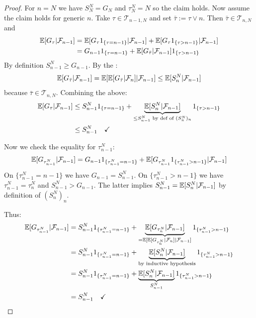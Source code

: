 \begin{proof}
     For $n=N$ we have $S_N^N = G_N$ and $\tau_N^N = N$ so the claim holds. Now assume the claim holds for generic $n$. Take $\tau \in \mathcal{T}_{n-1, N}$ and set $\bar{\tau} := \tau \vee n$. Then $\bar{\tau} \in \mathcal{T}_{n,N}$ and
    \begin{align*}
        \mathbb E[G_\tau | \mathcal{F}_{n-1}] &= \mathbb E[G_\tau 1_{\{\tau = n-1\}} | \mathcal{F}_{n-1}] + \mathbb E[G_\tau 1_{\{\tau > n-1\}} | \mathcal{F}_{n-1}] \\
        &= G_{n-1} 1_{\{\tau = n-1\}} + \mathbb E[G_{\bar{\tau}} | \mathcal{F}_{n-1}] 1_{\{\tau > n-1\}}
    \end{align*}
    By definition $S_{n-1}^N \ge G_{n-1}$. By the :
    $$\mathbb E[G_{\bar{\tau}} | \mathcal{F}_{n-1}] = \mathbb E[\mathbb E[G_{\bar{\tau}} | \mathcal{F}_n] | \mathcal{F}_{n-1}] \le \mathbb E[S_n^N | \mathcal{F}_{n-1}]$$
    because $\bar{\tau} \in \mathcal{T}_{n,N}$.
    Combining the above:
    \begin{align*}
        \mathbb E[G_\tau | \mathcal{F}_{n-1}] &\le S_{n-1}^N 1_{\{\tau = n-1\}} + \underbrace{\mathbb E[S_n^N | \mathcal{F}_{n-1}]}_{\le S_{n-1}^N \text{ by def of } (S_n^N)_n} 1_{\{\tau > n-1\}} \\
        &\le S_{n-1}^N \quad \checkmark
    \end{align*}
    
    Now we check the equality for $\tau_{n-1}^N$:
    $$\mathbb E[G_{\tau_{n-1}^N} | \mathcal{F}_{n-1}] = G_{n-1} 1_{\{\tau_{n-1}^N = n-1\}} + \mathbb E[G_{\tau_{n-1}^N} 1_{\{\tau_{n-1}^N > n-1\}} | \mathcal{F}_{n-1}]$$
    On $\{\tau_{n-1}^N = n-1\}$ we have $G_{n-1} = S_{n-1}^N$.
    On $\{\tau_{n-1}^N > n-1\}$ we have $\tau_{n-1}^N = \tau_n^N$ and $S_{n-1}^N > G_{n-1}$. The latter implies $S_{n-1}^N = \mathbb E[S_n^N | \mathcal{F}_{n-1}]$ by definition of $(S_n^N)_n$.
    
    Thus:
    \begin{align*}
        \mathbb E[G_{\tau_{n-1}^N} | \mathcal{F}_{n-1}] &= S_{n-1}^N 1_{\{\tau_{n-1}^N = n-1\}} + \underbrace{\mathbb E[G_{\tau_n^N} | \mathcal{F}_{n-1}]}_{= \mathbb E[\mathbb E[G_{\tau_n^N} | \mathcal{F}_n] | \mathcal{F}_{n-1}]} 1_{\{\tau_{n-1}^N > n-1\}} \\
        &= S_{n-1}^N 1_{\{\tau_{n-1}^N = n-1\}} + \underbrace{\mathbb E[S_n^N | \mathcal{F}_{n-1}]}_{\text{by inductive hypothesis}} 1_{\{\tau_{n-1}^N > n-1\}} \\
        &= S_{n-1}^N 1_{\{\tau_{n-1}^N = n-1\}} + \underbrace{\mathbb E[S_n^N | \mathcal{F}_{n-1}]}_{S_{n-1}^N} 1_{\{\tau_{n-1}^N > n-1\}} \\
        &= S_{n-1}^N \quad \checkmark
    \end{align*}


\end{proof}
